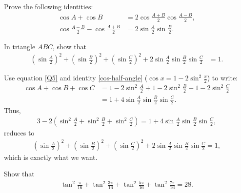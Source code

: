 \begin{question}
Prove the following identities:
\begin{align*}
    \cos A + \cos B &= 2 \cos{\frac{A + B}{2}} \cos{\frac{A - B}{2}},\\
    \cos{\frac{A - B}{2}} - \cos{\frac{A + B}{2}} &= 2 \sin{\frac A 2} \sin{\frac B 2}.
\end{align*}
\end{question}


\begin{question}
In triangle $ABC$, show that
\begin{align}
    \left(\sin{\frac{A}{2}}\right)^2+\left(\sin{\frac{B}{2}}\right)^2+\left(\sin{\frac{C}{2}}\right)^2 +2\sin{\frac{A}{2}}\sin{\frac{B}{2}}\sin{\frac{C}{2}} &= 1.
\end{align}
\end{question}

\begin{solution}
Use equation \eqref{Q5} and identity \eqref{cos-half-angle} ($\cos x = 1 -2 \sin^2 \frac x2$) to write:
    \begin{align*}
        \cos{A} +\cos{B}+\cos{C}&= 1 - 2\sin^2 \frac A2+ 1 - 2\sin^2 \frac B2 + 1 - 2\sin^2 \frac C2\\
        &=1+4\sin{\frac{A}{2}}\sin{\frac{B}{2}}\sin{\frac{C}{2}}.
    \end{align*}
Thus,
    \begin{align*}
        3 - 2 \left( \sin^2 \frac A2 + \sin^2 \frac B2 + \sin^2 \frac C2\right) = 1 + 4\sin{\frac{A}{2}}\sin{\frac{B}{2}}\sin{\frac{C}{2}},
    \end{align*}
reduces to
    \begin{align*}
        \left(\sin{\frac{A}{2}}\right)^2+\left(\sin{\frac{B}{2}}\right)^2+\left(\sin{\frac{C}{2}}\right)^2 +2\sin{\frac{A}{2}}\sin{\frac{B}{2}}\sin{\frac{C}{2}} = 1,
    \end{align*}
which is exactly what we want.
\end{solution}


\begin{question}
Show that
    \begin{align*}
        \tan^2\frac{\pi}{16}+ \tan^2\frac{3\pi}{16}+\tan^2\frac{5\pi}{16} + \tan^2\frac{7\pi}{16} = 28.
    \end{align*}
\end{question}

